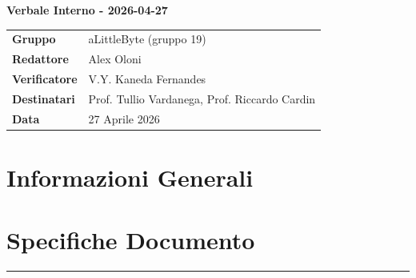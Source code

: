 \documentclass[a4paper,12pt]{article}
\begin{document}
\thispagestyle{firstpage}

\vspace*{0.5cm}

\begin{center}
    {\LARGE \textbf{Verbale Interno - 2026-04-27}}
\end{center}

\vspace{1.5cm}

\begin{center}
    \renewcommand{\arraystretch}{1.3}
    \begin{tcolorbox}[
        width=0.92\textwidth,
        colback=gray!6,
        colframe=gray!45,
        boxrule=0.5pt,
        arc=2mm,
        boxsep=0pt,
        left=8pt, right=8pt, top=8pt, bottom=8pt
    ]
        \begin{tabularx}{\linewidth}{>{\bfseries}p{3.5cm} X}
            Gruppo      & aLittleByte (gruppo 19) \\
            Redattore   & Alex Oloni \\
            Verificatore & V.Y. Kaneda Fernandes\\
            Destinatari & Prof. Tullio Vardanega, Prof. Riccardo Cardin \\
            Data        & 27 Aprile 2026\\
        \end{tabularx}
    \end{tcolorbox}
\end{center}

\newpage

\tableofcontents
\newpage
\section{Informazioni Generali}
\section*{Specifiche Documento}
\hrule
\vspace{1cm}
\end{document}
